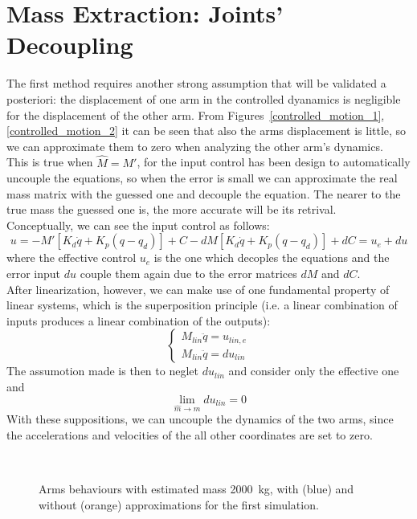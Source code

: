 \documentclass[a4paper,12pt,oneside]{report}
\begin{document}
\section{Mass Extraction: Joints' Decoupling} \label{decoupling}
The first method requires another strong assumption that will be validated a posteriori: the displacement of one arm in the controlled dyanamics is negligible for the displacement of the other arm. From Figures~\ref{controlled_motion_1}, \ref{controlled_motion_2} it can be seen that also the arms displacement is little, so we can approximate them to zero when analyzing the other arm's dynamics.\\
This is true when $\hat{M}=M'$, for the input control has been design to automatically uncouple the equations, so when the error is small we can approximate the real mass matrix with the guessed one and decouple the equation. The nearer to the true mass the guessed one is, the more accurate will be its retrival.\\
Conceptually, we can see the input control as follows:
\begin{equation}
  u=-M'[K_d\dot{q}+K_p(q-q_d)]+C-dM[K_d\dot{q}+K_p(q-q_d)]+dC=u_e+du
\end{equation}
where the effective control $u_e$ is the one which decoples the equations and the error input $du$ couple them again due to the error matrices $dM$ and $dC$.\\
After linearization, however, we can make use of one fundamental property of linear systems, which is the superposition principle (i.e. a linear combination of inputs produces a linear combination of the outputs):
\begin{equation}
  \begin{cases}
    M_{lin}\ddot{q}=u_{lin,e}\\
    M_{lin}\ddot{q}=du_{lin}
  \end{cases}
\end{equation}
The assumotion made is then to neglet $du_{lin}$ and consider only the effective one and \[ \lim_{\hat{m} \to m}du_{lin}=0\]
With these suppositions, we can uncouple the dynamics of the two arms, since the accelerations and velocities of the all other coordinates are set to zero.
\begin{figure}[h]
  \centering
   \\
  \caption{Arms behaviours with estimated mass \SI{2000}{\kilogram}, with (blue) and without (orange) approximations for the first simulation.}
  \label{approximations}
\end{figure}\\
\end{document}

